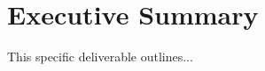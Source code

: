 
\clearpage
\section*{Executive Summary}
\label{sec:summary}


This specific deliverable outlines... 

